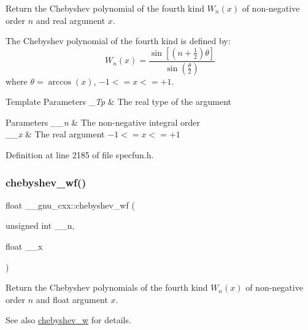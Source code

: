 Return the Chebyshev polynomial of the fourth kind $ W_n(x) $ of non-\/negative order $ n $ and real argument $ x $.

The Chebyshev polynomial of the fourth kind is defined by\+: \[ W_n(x) = \frac{\sin \left[ \left(n+\frac{1}{2}\right)\theta \right]} {\sin \left(\frac{\theta}{2}\right)} \] where $ \theta = \arccos(x) $, $ -1 <= x <= +1 $.


\begin{DoxyTemplParams}{Template Parameters}
{\em \+\_\+\+Tp} & The real type of the argument \\
\hline
\end{DoxyTemplParams}

\begin{DoxyParams}{Parameters}
{\em \+\_\+\+\_\+n} & The non-\/negative integral order \\
\hline
{\em \+\_\+\+\_\+x} & The real argument $ -1 <= x <= +1 $ \\
\hline
\end{DoxyParams}


Definition at line 2185 of file specfun.\+h.

\mbox{\label{group__gnu__math__spec__func_gae6d468cee53df584e40afe294127b090}} 
\subsubsection{\texorpdfstring{chebyshev\+\_\+wf()}{chebyshev\_wf()}}
{\footnotesize\ttfamily float \+\_\+\+\_\+gnu\+\_\+cxx\+::chebyshev\+\_\+wf (\begin{DoxyParamCaption}\item[{unsigned int}]{\+\_\+\+\_\+n,  }\item[{float}]{\+\_\+\+\_\+x }\end{DoxyParamCaption})\hspace{0.3cm}{\ttfamily [inline]}}

Return the Chebyshev polynomials of the fourth kind $ W_n(x) $ of non-\/negative order $ n $ and {\ttfamily float} argument $ x $.

\begin{DoxySeeAlso}{See also}
\hyperlink{group__gnu__math__spec__func_gaa156c6c21e99104ebcb627e92aceada0}{chebyshev\+\_\+w} for details. 
\end{DoxySeeAlso}


